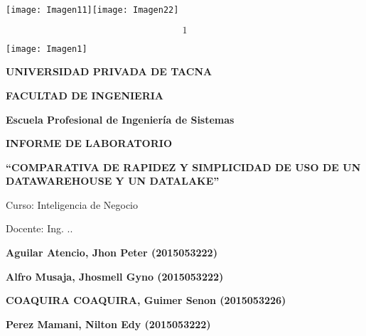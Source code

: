 \documentclass{article} %
\begin{document}


\noindent 

\noindent 

\noindent 

\noindent 

\noindent \texttt{[image: Imagen11]}\texttt{[image: Imagen22]}\textbf{ }

\noindent 

\noindent 
\[1\] 


\noindent \texttt{[image: Imagen1]}\textbf{\underbar{}}

\noindent \textbf{}

\noindent \textbf{UNIVERSIDAD PRIVADA DE TACNA}

\noindent \textbf{}

\noindent \textbf{FACULTAD DE INGENIERIA}

\noindent \textbf{\textit{}}

\noindent \textbf{\textit{}}

\noindent \textbf{Escuela Profesional de Ingenier\'{i}a de Sistemas}

\noindent \textbf{}

\noindent 

\noindent \textbf{ INFORME DE LABORATORIO}

\noindent \textbf{``COMPARATIVA DE RAPIDEZ Y SIMPLICIDAD DE USO DE UN DATAWAREHOUSE Y UN DATALAKE''}

\noindent \textbf{}

\noindent Curso: Inteligencia de Negocio

\noindent \textbf{\textit{}}

\noindent \textbf{}

\noindent \textbf{}

\noindent Docente: Ing. ..

\noindent \textbf{}

\noindent \textbf{Aguilar Atencio, Jhon Peter (2015053222)}

\noindent \textbf{Alfro Musaja, Jhosmell Gyno (2015053222)}

\noindent \textbf{COAQUIRA COAQUIRA, Guimer Senon (2015053226)}

\noindent \textbf{Perez Mamani, Nilton Edy (2015053222)}

\noindent \textbf{}
\end{document}
